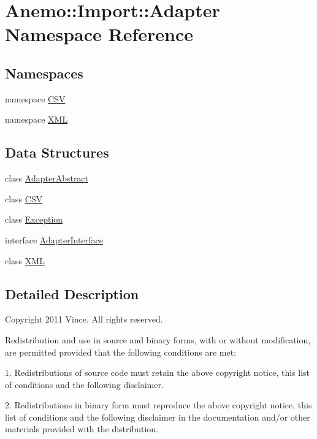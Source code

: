\hypertarget{namespace_anemo_1_1_import_1_1_adapter}{
\section{Anemo::Import::Adapter Namespace Reference}
\label{namespace_anemo_1_1_import_1_1_adapter}
}
\subsection*{Namespaces}
\begin{DoxyCompactItemize}
\item 
namespace \hyperlink{namespace_anemo_1_1_import_1_1_adapter_1_1_c_s_v}{CSV}
\item 
namespace \hyperlink{namespace_anemo_1_1_import_1_1_adapter_1_1_x_m_l}{XML}
\end{DoxyCompactItemize}
\subsection*{Data Structures}
\begin{DoxyCompactItemize}
\item 
class \hyperlink{class_anemo_1_1_import_1_1_adapter_1_1_adapter_abstract}{AdapterAbstract}
\item 
class \hyperlink{class_anemo_1_1_import_1_1_adapter_1_1_c_s_v}{CSV}
\item 
class \hyperlink{class_anemo_1_1_import_1_1_adapter_1_1_exception}{Exception}
\item 
interface \hyperlink{interface_anemo_1_1_import_1_1_adapter_1_1_adapter_interface}{AdapterInterface}
\item 
class \hyperlink{class_anemo_1_1_import_1_1_adapter_1_1_x_m_l}{XML}
\end{DoxyCompactItemize}


\subsection{Detailed Description}
Copyright 2011 Vince. All rights reserved.

Redistribution and use in source and binary forms, with or without modification, are permitted provided that the following conditions are met:

1. Redistributions of source code must retain the above copyright notice, this list of conditions and the following disclaimer.

2. Redistributions in binary form must reproduce the above copyright notice, this list of conditions and the following disclaimer in the documentation and/or other materials provided with the distribution.

